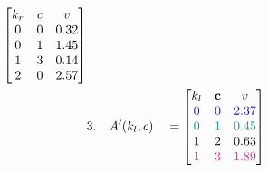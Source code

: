 \begin{figure}[H]
\begin{alignat*}{5}
\begin{bmatrix}
                                                                        k_r & c & v    \\
                                                                        0   & 0 & 0.32 \\
                                                                        0   & 1 & 1.45 \\
                                                                        1   & 3 & 0.14 \\
                                                                        2   & 0 & 2.57 \\
                                                                    \end{bmatrix}
        \\
         & 3.      &                           & A'(k_l, c)     &                                                                                      & = \begin{bmatrix}
                                                                                                                                                               k_l                      & \textbf{c}               & v                           \\
                                                                                                                                                               \color{blind-blue}0      & \color{blind-blue}0      & \color{blind-blue}2.37      \\
                                                                                                                                                               \color{blind-turquoise}0 & \color{blind-turquoise}1 & \color{blind-turquoise}0.45 \\
                                                                                                                                                               1                        & 2                        & 0.63                        \\
                                                                                                                                                               \color{blind-purple}1    & \color{blind-purple}3    & \color{blind-purple}1.89    \\
                                                                                                                                                           \end{bmatrix}

\end{alignat*}
\end{figure}
